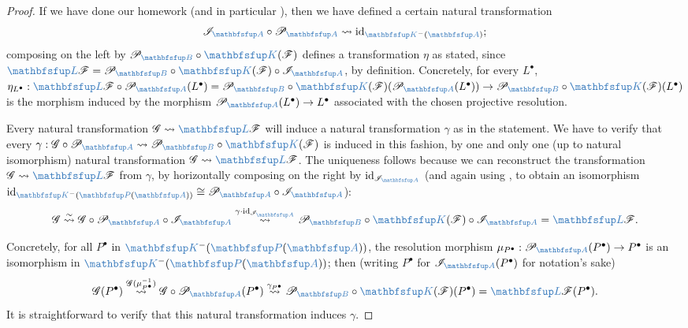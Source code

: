 \begin{proof}
  If we have done our homework (and in particular
  ), then we have
  defined a certain natural transformation
  \[
    \mathscr{I}_{\categ{A}} \circ \mathscr{P}_{\categ{A}}
    \rightsquigarrow \id_{\categ{K}^-(\categ{A})};
  \]
  composing on the left by
  $\mathscr{P}_{\categ{B}} \circ \categ{K}(\mathscr{F})$ defines a
  transformation $\eta$ as stated, since
  $\categ{L}\mathscr{F} = \mathscr{P}_{\categ{B}} \circ
  \categ{K}(\mathscr{F}) \circ \mathscr{I}_{\categ{A}}$, by
  definition. Concretely, for every $L^\bullet$,
  $\eta_{L^\bullet} : \categ{L}\mathscr{F} \circ
  \mathscr{P}_{\categ{A}}(L^\bullet) = \mathscr{P}_{\categ{B}} \circ
  \categ{K}(\mathscr{F})(\mathscr{P}_{\categ{A}}(L^\bullet)) \to
  \mathscr{P}_{\categ{B}} \circ \categ{K}(\mathscr{F})(L^\bullet)$ is
  the morphism induced by the morphism
  $\mathscr{P}_{\categ{A}}(L^\bullet) \to L^\bullet$ associated with
  the chosen projective resolution.

  Every natural transformation
  $\mathscr{G} \rightsquigarrow \categ{L}\mathscr{F}$ will induce a
  natural transformation $\gamma$ as in the statement. We have to
  verify that every
  $\gamma : \mathscr{G} \circ \mathscr{P}_{\categ{A}} \rightsquigarrow
  \mathscr{P}_{\categ{B}} \circ \categ{K}(\mathscr{F})$ is induced in
  this fashion, by one and only one (up to natural isomorphism)
  natural transformation $\mathscr{G} \rightsquigarrow
  \categ{L}\mathscr{F}$. The uniqueness follows because we can
  reconstruct the transformation
  $\mathscr{G} \rightsquigarrow \categ{L}\mathscr{F}$ from $\gamma$,
  by horizontally composing on the right by
  $\id_{\mathscr{I}_{\categ{A}}}$ (and again using
  , to obtain an
  isomorphism
  $\id_{\categ{K}^-(\categ{P}(\categ{A}))} \cong \mathscr{P}_{\categ{A}}
  \circ \mathscr{I}_{\categ{A}}$):
  \[
    \mathscr{G} \overset{\sim}{\rightsquigarrow} \mathscr{G} \circ
    \mathscr{P}_{\categ{A}} \circ \mathscr{I}_{\categ{A}}
    \overset{\gamma \cdot
      \id_{\mathscr{I}_{\categ{A}}}}{\rightsquigarrow} \mathscr{P}_{\categ{B}} \circ
    \categ{K}(\mathscr{F}) \circ \mathscr{I}_{\categ{A}} =
    \categ{L}\mathscr{F}.
  \]

  Concretely, for all $P^\bullet$ in $\categ{K}^-(\categ{P}(\categ{A}))$,
  the resolution morphism
  $\mu_{P^\bullet} : \mathscr{P}_{\categ{A}}(P^\bullet) \to P^\bullet$
  is an isomorphism in $\categ{K}^-(\categ{P}(\categ{A}))$; then
  (writing $P^\bullet$ for $\mathscr{I}_{\categ{A}}(P^\bullet)$ for
  notation's sake)
  \[
    \mathscr{G}(P^\bullet) \overset{\mathscr{G}(\mu_{P^\bullet}^{-1})}
    {\rightsquigarrow} \mathscr{G} \circ \mathscr{P}_{\categ{A}}(P^\bullet)
    \overset{\gamma_{P^\bullet}}{\rightsquigarrow} \mathscr{P}_{\categ{B}}
    \circ \categ{K}(\mathscr{F})(P^\bullet) = \categ{L}\mathscr{F}(P^\bullet).
  \]
  It is straightforward to verify that this natural transformation
  induces $\gamma$.
\end{proof}

